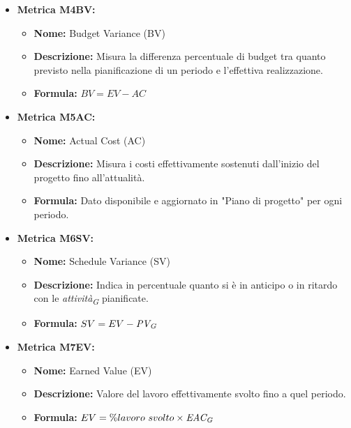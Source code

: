 \begin{itemize}
    \item \hypertarget{item:M4BV}{\textbf{Metrica M4BV:}}
     \begin{minipage}[t]{0.9\textwidth}
          \begin{itemize}
              \item \textbf{Nome:} Budget Variance (BV)
              \item \textbf{Descrizione:} Misura la differenza percentuale di budget tra quanto previsto nella pianificazione di un periodo e l’effettiva realizzazione. 
              \item \textbf{Formula:} $BV = EV - AC $
          \end{itemize}
        \end{minipage}

    \item \hypertarget{item:M5AC}{\textbf{Metrica M5AC:}}
    \begin{minipage}[t]{0.9\textwidth}
          \begin{itemize}
              \item \textbf{Nome:} Actual Cost (AC)
              \item \textbf{Descrizione:} Misura i costi effettivamente sostenuti dall’inizio del progetto fino all’attualità. 
              \item \textbf{Formula:} Dato disponibile e aggiornato in "Piano di progetto" per ogni periodo.
          \end{itemize}
        \end{minipage}

    \item \hypertarget{item:M6SV}{\textbf{Metrica M6SV:}}
    \begin{minipage}[t]{0.9\textwidth}
          \begin{itemize}
              \item \textbf{Nome:} Schedule Variance (SV)
              \item \textbf{Descrizione:} Indica in percentuale quanto si è in anticipo o in ritardo con le \textit{attività}\textsubscript{\textit{G}} pianificate. 
              \item \textbf{Formula:} $SV = EV - \textit{PV}\textsubscript{\textit{G}}$
          \end{itemize}
        \end{minipage}

    \item \hypertarget{item:M7EV}{\textbf{Metrica M7EV:}}
    \begin{minipage}[t]{0.9\textwidth}
          \begin{itemize}
              \item \textbf{Nome:} Earned Value (EV)
              \item \textbf{Descrizione:} Valore del lavoro effettivamente svolto fino a quel periodo.
              \item \textbf{Formula:} $EV = \% lavoro \ svolto \times \textit{EAC}\textsubscript{\textit{G}}$
          \end{itemize}
        \end{minipage}


\end{itemize}
